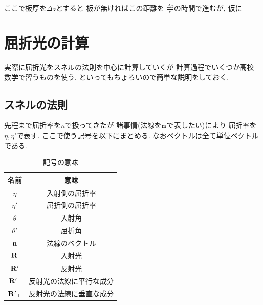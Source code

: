 \documentclass[a4paper, xelatex, ja=standard]{bxjsarticle}
\begin{document}
ここで板厚を$\Delta z$とすると
板が無ければこの距離を
$\frac{\Delta z}{c}$の時間で進むが,
仮に



\section{屈折光の計算}
実際に屈折光をスネルの法則を中心に計算していくが
計算過程でいくつか高校数学で習うものを使う.
といってもちょろいので簡単な説明をしておく.

\subsection{スネルの法則}
先程まで屈折率を$n$で扱ってきたが
諸事情(法線を$\vb{n}$で表したい)により
屈折率を$\eta, \eta'$で表す.
ここで使う記号を以下にまとめる.
なおベクトルは全て単位ベクトルである.
\begin{table}[h]
  \centering
  \caption{記号の意味}
  \label{}
  \begin{tabular}{c|c}
  名前 & 意味 \\\hline
  $\eta$ & 入射側の屈折率 \\
  $\eta'$ & 屈折側の屈折率 \\
  $\theta$ & 入射角 \\
  $\theta'$ & 屈折角 \\
  $\vb{n}$ & 法線のベクトル \\
  $\vb{R}$ & 入射光 \\
  $\vb{R'}$ & 反射光 \\
  $\vb{R'}_\parallel$ & 反射光の法線に平行な成分 \\
  $\vb{R'}_\perp$ & 反射光の法線に垂直な成分 \\
  \end{tabular}
\end{table}
\end{document}
